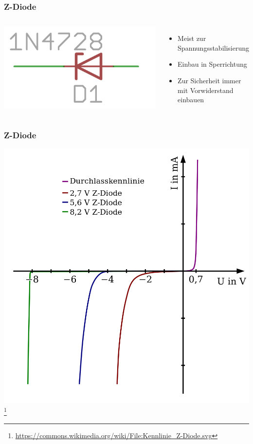 \begin{frame}
    \frametitle{Z-Diode}
	\begin{columns}[c]
        \column[c]{5cm}
        \begin{center}
        \includegraphics[width=.8\textwidth]{a05/z-diode.png}
        \end{center}
        \column{5cm}
    \begin{itemize}
			\item Meist zur Spannungsstabilisierung
			\item Einbau in Sperrichtung
			\item Zur Sicherheit immer mit Vorwiderstand einbauen
    \end{itemize}
    \end{columns}
\end{frame}

\begin{frame}
    \frametitle{Z-Diode}
    \begin{center}
        \includegraphics[width=.7\textwidth]{a05/Kennlinie_Z-Diode.png}
        \footnote{\tiny \url{https://commons.wikimedia.org/wiki/File:Kennlinie_Z-Diode.svg}}
	\end{center}
\end{frame}

